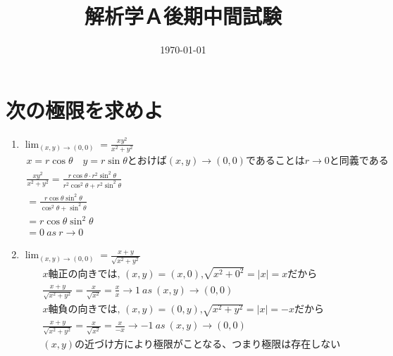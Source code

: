\documentclass[a4paper,10pt]{jarticle}
\title{解析学Ａ後期中間試験}
\date{\today}
\begin{document}
\setlength{\parindent}{0pt}
\setlength{\columnseprule}{0.4pt}

\renewcommand{\thesection}{\fbox{\arabic{section}}}
\renewcommand{\labelenumi}{(\theenumi)}

\maketitle

\section{次の極限を求めよ}
\begin{enumerate}
\item $\displaystyle \lim_{(x,y) \to (0,0)} = \frac{xy^2}{x^2+y^2}$\begin{gather*}
	x = r \cos\theta \quad y = r \sin\theta \text{とおけば} (x,y) \to (0,0) \text{であることは} r \to 0 \text{と同義である}\\
	\frac{xy^2}{x^2+y^2} = \frac{r\cos\theta \cdot r^2\sin^2\theta}{r^2 \cos^2\theta + r^2\sin^2\theta} \\
	=\frac{r\cos\theta\sin^2\theta}{\cos^2\theta+\sin^2\theta} \\
	=r\cos\theta\sin^2\theta\\
	=0 \  as \ r \to 0
\end{gather*}
\item $\displaystyle \lim_{(x,y) \to (0,0)} = \frac{x+y}{\sqrt{x^2+y^2}}$\begin{gather*}
	x\text{軸正の向きでは, }(x, y) = (x, 0) \text{,} \sqrt{x^2 + 0^2} = |x| = x \text{だから} \\
	\frac{x+y}{\sqrt{x^2+y^2}} = \frac{x}{\sqrt{x^2}} = \frac{x}{x} \to 1 \ as \ (x,y) \to (0,0) \\
	x\text{軸負の向きでは, }(x, y) = (0, y) \text{,} \sqrt{x^2 + y^2} = |x| = -x \text{だから} \\
	\frac{x+y}{\sqrt{x^2+y^2}} = \frac{x}{\sqrt{x^2}} = \frac{x}{-x} \to -1 \ as \ (x,y) \to (0,0) \\
	(x,y)\text{の近づけ方により極限がことなる、つまり極限は存在しない}
\end{gather*}
\end{enumerate}

\end{document}
